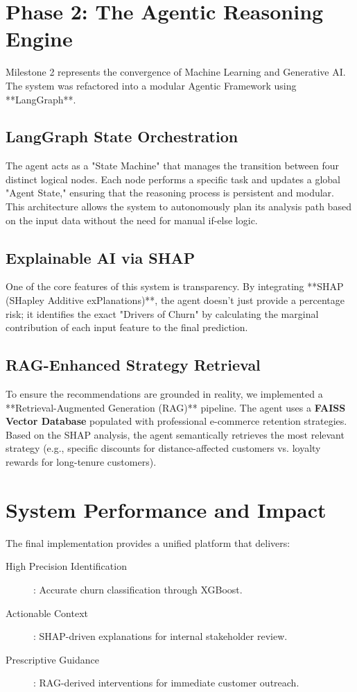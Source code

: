 \documentclass[a4paper,12pt]{article}
\begin{document}
\newpage
\section{Phase 2: The Agentic Reasoning Engine}
Milestone 2 represents the convergence of Machine Learning and Generative AI. The system was refactored into a modular Agentic Framework using **LangGraph**.

\subsection{LangGraph State Orchestration}
The agent acts as a "State Machine" that manages the transition between four distinct logical nodes. Each node performs a specific task and updates a global "Agent State," ensuring that the reasoning process is persistent and modular. This architecture allows the system to autonomously plan its analysis path based on the input data without the need for manual if-else logic.

\subsection{Explainable AI via SHAP}
One of the core features of this system is transparency. By integrating **SHAP (SHapley Additive exPlanations)**, the agent doesn't just provide a percentage risk; it identifies the exact "Drivers of Churn" by calculating the marginal contribution of each input feature to the final prediction.

\subsection{RAG-Enhanced Strategy Retrieval}
To ensure the recommendations are grounded in reality, we implemented a **Retrieval-Augmented Generation (RAG)** pipeline. The agent uses a \textbf{FAISS Vector Database} populated with professional e-commerce retention strategies. Based on the SHAP analysis, the agent semantically retrieves the most relevant strategy (e.g., specific discounts for distance-affected customers vs. loyalty rewards for long-tenure customers).

\section{System Performance and Impact}
The final implementation provides a unified platform that delivers:
\begin{description}
    \item[High Precision Identification]: Accurate churn classification through XGBoost.
    \item[Actionable Context]: SHAP-driven explanations for internal stakeholder review.
    \item[Prescriptive Guidance]: RAG-derived interventions for immediate customer outreach.
\end{description}
\end{document}

